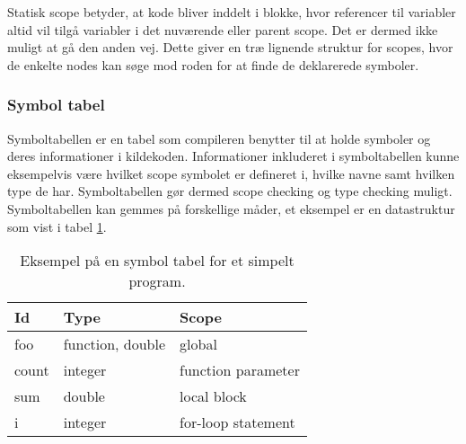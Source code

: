 Statisk scope betyder, at kode bliver inddelt i blokke, hvor referencer til variabler altid vil tilgå variabler i det nuværende eller parent scope. Det er dermed ikke muligt at gå den anden vej. Dette giver en træ lignende struktur for scopes, hvor de enkelte nodes kan søge mod roden for at finde de deklarerede symboler.

    
    
\subsubsection{Symbol tabel}
Symboltabellen er en tabel som compileren benytter til at holde symboler og deres informationer i kildekoden. Informationer inkluderet i symboltabellen kunne eksempelvis være hvilket scope symbolet er defineret i, hvilke navne samt hvilken type de har. Symboltabellen gør dermed scope checking og type checking muligt. Symboltabellen kan gemmes på forskellige måder, et eksempel er en datastruktur som vist i tabel \ref{tab:symboltabel}.
    
    

    \begin{table}[H]
    \centering\footnotesize
    \begin{tabular}{l|l|l}
    \textbf{Id} & \textbf{Type} & \textbf{Scope} \\\bottomrule
    foo & function, double & global\\
    count & integer & function parameter\\
    sum & double & local block\\
    i & integer & for-loop statement
    \end{tabular}
    \caption{Eksempel på en symbol tabel for et simpelt program.}
    \label{tab:symboltabel}
    \end{table}
    
